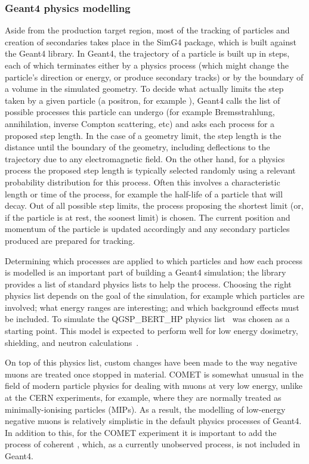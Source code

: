 \subsubsection{Geant4 physics modelling}
Aside from the production target region, most of the tracking of particles and creation of secondaries takes place in the SimG4 package, which is built against the Geant4 library.
In Geant4, the trajectory of a particle is built up in steps, each of which terminates either by a physics process (which might change the particle's direction or energy, or produce secondary tracks) or by the boundary of a volume in the simulated geometry.
To decide what actually limits the step taken by a given particle (a positron, for example ), Geant4 calls the list of possible processes this particle can undergo (for example Bremsstrahlung, annihilation, inverse Compton scattering, etc) and asks each process for a proposed step length. 
In the case of a geometry limit, the step length is the distance until the boundary of the geometry, including deflections to the trajectory due to any electromagnetic field.
On the other hand, for a physics process the proposed step length is typically selected randomly using a relevant probability distribution for this process.
Often this involves a characteristic length or time of the process, for example the half-life of a particle that will decay.
Out of all possible step limits, the process proposing the shortest limit (or, if the particle is at rest, the soonest limit) is chosen.
The current position and momentum of the particle is updated accordingly and any secondary particles produced are prepared for tracking.

\FigSoftwarePhysicsSpectra
Determining which processes are applied to which particles and how each process is modelled is an important part of building a Geant4 simulation; the library provides a list of standard physics lists to help the process.
Choosing the right physics list depends on the goal of the simulation, for example which particles are involved; what energy ranges are interesting; and which background effects must be included.
To simulate \COMET the QGSP\_BERT\_HP physics list~\cite{Geant4:QGSP-BERT} was chosen as a starting point.
This model is expected to perform well for low energy dosimetry, shielding, and neutron calculations~\cite{Geant4:PhysicsListsRecommends}.

On top of this physics list, custom changes have been made to the way negative muons are treated once stopped in material.
COMET is somewhat unusual in the field of modern particle physics for dealing with muons at very low energy, unlike at the \ac{CERN} experiments, for example, where they are normally treated as minimally-ionising particles (MIPs).
As a result,  the modelling of low-energy negative muons is relatively simplistic in the default physics processes of Geant4.
In addition to this, for the COMET experiment it is important to add the process of coherent \mueconv, which, as a currently unobserved process, is not included in Geant4.

